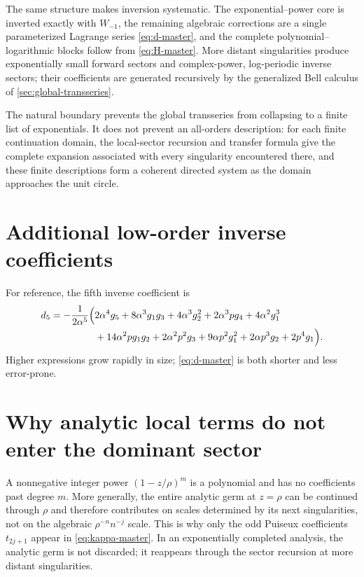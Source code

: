 \documentclass[11pt]{article}
\theoremstyle{definition}
\theoremstyle{remark}
\begin{document}
The same structure makes inversion systematic.  The exponential--power core
is inverted exactly with $W_{-1}$, the remaining algebraic corrections are a
single parameterized Lagrange series \cref{eq:d-master}, and the complete
polynomial--logarithmic blocks follow from \cref{eq:H-master}.  More distant
singularities produce exponentially small forward sectors and complex-power,
log-periodic inverse sectors; their coefficients are generated recursively by
the generalized Bell calculus of \cref{sec:global-transseries}.

The natural boundary prevents the global transseries from collapsing to a
finite list of exponentials.  It does not prevent an all-orders description:
for each finite continuation domain, the local-sector recursion and transfer
formula give the complete expansion associated with every singularity
encountered there, and these finite descriptions form a coherent directed
system as the domain approaches the unit circle.

\appendix

\section{Additional low-order inverse coefficients}

For reference, the fifth inverse coefficient is
\begin{align*}
 d_5=-\frac1{2\alpha^5}\Bigl(&2\alpha^4g_5
 +8\alpha^3g_1g_3+4\alpha^3g_2^2+2\alpha^3pg_4
 +4\alpha^2g_1^3\\
 &+14\alpha^2p g_1g_2+2\alpha^2p^2g_3
 +9\alpha p^2g_1^2+2\alpha p^3g_2+2p^4g_1\Bigr).
\end{align*}
Higher expressions grow rapidly in size; \cref{eq:d-master} is both shorter
and less error-prone.

\section{Why analytic local terms do not enter the dominant sector}

A nonnegative integer power $(1-z/\rho)^m$ is a polynomial and has no
coefficients past degree $m$.  More generally, the entire analytic germ at
$z=\rho$ can be continued through $\rho$ and therefore contributes on scales
determined by its next singularities, not on the algebraic
$\rho^{-n}n^{-j}$ scale.  This is why only the odd Puiseux coefficients
$t_{2j+1}$ appear in \cref{eq:kappa-master}.  In an exponentially completed
analysis, the analytic germ is not discarded; it reappears through the
sector recursion at more distant singularities.
\end{document}
